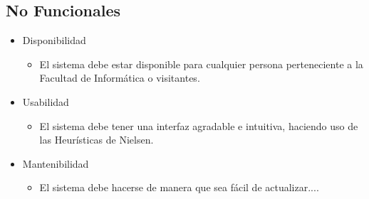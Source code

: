\documentclass[a4paper,12pt]{article}
\begin{document}
	\subsection{No Funcionales}
	
	\begin{itemize}
		\item Disponibilidad
		\begin{itemize}
			\item El sistema debe estar disponible para cualquier persona perteneciente a la Facultad de Informática o visitantes.
		\end{itemize}
		\item Usabilidad
		\begin{itemize}
			\item El sistema debe tener una interfaz agradable e intuitiva, haciendo uso de las Heurísticas de Nielsen.
		\end{itemize}
		\item Mantenibilidad
		\begin{itemize}
			\item El sistema debe hacerse de manera que sea fácil de actualizar....
		\end{itemize}
	\end{itemize}
	
	
\end{document}
